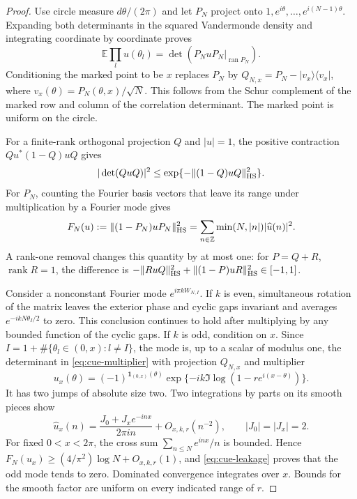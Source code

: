 \begin{proof}
Use circle measure $d\theta/(2\pi)$ and let $P_N$ project onto
$1,e^{i\theta},\ldots,e^{i(N-1)\theta}$. Expanding both determinants
in the squared Vandermonde density and integrating coordinate by
coordinate proves
\begin{equation}\label{eq:cue-multiplier}
 \mathbb E\prod_l u(\theta_l)
       =\det(P_NuP_N|_{\operatorname{ran}P_N}).
\end{equation}
Conditioning the marked point to be $x$ replaces $P_N$ by
$Q_{N,x}=P_N-|v_x\rangle\langle v_x|$, where
$v_x(\theta)=P_N(\theta,x)/\sqrt N$. This follows from the Schur
complement of the marked row and column of the correlation determinant.
The marked point is uniform on the circle.

For a finite-rank orthogonal projection $Q$ and $|u|=1$, the positive
contraction $Qu^*(1-Q)uQ$ gives
\begin{equation}\label{eq:cue-leakage}
 |\det(QuQ)|^2
 \le\exp\{-\|(1-Q)uQ\|_{\rm HS}^2\}.
\end{equation}
For $P_N$, counting the Fourier basis vectors that leave its range
under multiplication by a Fourier mode gives
\[
 F_N(u):=\|(1-P_N)uP_N\|_{\rm HS}^2
       =\sum_{n\in\mathbb Z}\min(N,|n|)|\widehat u(n)|^2.
\]
A rank-one removal changes this quantity by at most one: for $P=Q+R$,
$\operatorname{rank}R=1$, the difference is
$-\|RuQ\|_{\rm HS}^2+\|(1-P)uR\|_{\rm HS}^2\in[-1,1]$.

Consider a nonconstant Fourier mode $e^{i\pi kW_{N,I}}$. If $k$ is
even, simultaneous rotation of the matrix leaves the exterior phase
and cyclic gaps invariant and averages $e^{-ikN\theta_I/2}$ to zero.
This conclusion continues to hold after multiplying by any bounded
function of the cyclic gaps. If $k$ is odd, condition on $x$.
Since $I=1+\#\{\theta_l\in(0,x):l\ne I\}$, the mode is, up to a
scalar of modulus one, the determinant in \eqref{eq:cue-multiplier}
with projection $Q_{N,x}$ and multiplier
\[
 u_x(\theta)=(-1)^{\mathbf1_{(0,x)}(\theta)}
     \exp\{-ik\Im\log(1-r e^{i(x-\theta)})\}.
\]
It has two jumps of absolute size two. Two integrations by parts on
its smooth pieces show
\[
 \widehat u_x(n)=\frac{J_0+J_xe^{-inx}}{2\pi in}+O_{x,k,r}(n^{-2}),
 \qquad |J_0|=|J_x|=2.
\]
For fixed $0<x<2\pi$, the cross sum
$\sum_{n\le N}e^{inx}/n$ is bounded. Hence
$F_N(u_x)\ge(4/\pi^2)\log N+O_{x,k,r}(1)$, and
\eqref{eq:cue-leakage} proves that the odd mode tends to zero.
Dominated convergence integrates over $x$. Bounds for the smooth
factor are uniform on every indicated range of $r$.


\end{proof}
